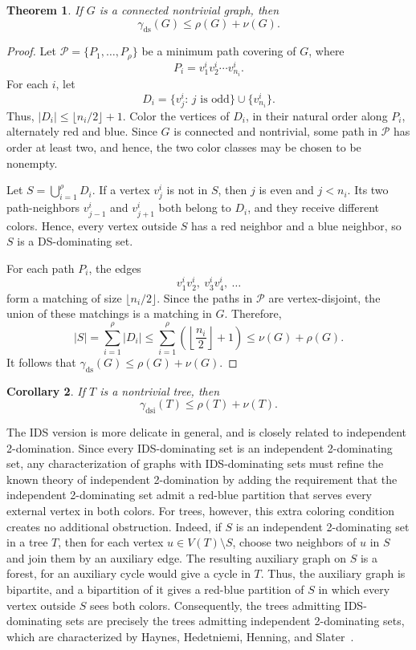 \documentclass[11pt]{article}
\newtheorem{theorem}{Theorem}
\newtheorem{corollary}[theorem]{Corollary}
\theoremstyle{definition}
\theoremstyle{remark}
\newcommand{\ds}{\mathrm{ds}}
\newcommand{\dsi}{\mathrm{dsi}}
\begin{document}
\begin{theorem}
\label{thm:path-cover-matching-ds}
If \(G\) is a connected nontrivial graph, then
\[
   \gamma_{\ds}(G)\le \rho(G)+\nu(G).
\]
\end{theorem}

\begin{proof}
Let \(\mathcal P=\{P_1,\ldots,P_{\rho}\}\) be a minimum path covering of
\(G\), where
\[
   P_i=v^i_1v^i_2\cdots v^i_{n_i}.
\]
For each \(i\), let
\[
   D_i=\{v^i_j:\, j \text{ is odd}\}\cup \{v^i_{n_i}\}.
\]
Thus, \(|D_i|\le \lfloor n_i/2\rfloor+1\). Color the vertices of \(D_i\), in
their natural order along \(P_i\), alternately red and blue. Since \(G\) is
connected and nontrivial, some path in \(\mathcal P\) has order at least two,
and hence, the two color classes may be chosen to be nonempty.

Let \(S=\bigcup_{i=1}^{\rho}D_i\). If a vertex \(v^i_j\) is not in \(S\),
then \(j\) is even and \(j<n_i\). Its two path-neighbors
\(v^i_{j-1}\) and \(v^i_{j+1}\) both belong to \(D_i\), and they receive
different colors. Hence, every vertex outside \(S\) has a red neighbor and a
blue neighbor, so \(S\) is a DS-dominating set.

For each path \(P_i\), the edges
\[
   v^i_1v^i_2,\ v^i_3v^i_4,\ \ldots
\]
form a matching of size \(\lfloor n_i/2\rfloor\). Since the paths in
\(\mathcal P\) are vertex-disjoint, the union of these matchings is a
matching in \(G\). Therefore,
\[
   |S|
      =\sum_{i=1}^{\rho}|D_i|
      \le \sum_{i=1}^{\rho}\left(\left\lfloor\frac{n_i}{2}\right\rfloor+1\right)
      \le \nu(G)+\rho(G).
\]
It follows that \(\gamma_{\ds}(G)\le \rho(G)+\nu(G)\).
\end{proof}

\begin{corollary}
\label{cor:path-cover-matching-trees}
If \(T\) is a nontrivial tree, then
\[
   \gamma_{\dsi}(T)\le \rho(T)+\nu(T).
\]
\end{corollary}





The IDS version is more delicate in general, and is closely related to
independent 2-domination.  Since every IDS-dominating set is an independent 2-dominating
set, any characterization of graphs with IDS-dominating sets must refine the
known theory of independent 2-domination by adding the requirement that the
independent 2-dominating set admit a red-blue partition that serves every
external vertex in both colors. For trees, however, this extra coloring
condition creates no additional obstruction. Indeed, if \(S\) is an
independent 2-dominating set in a tree \(T\), then for each vertex
\(u\in V(T)\setminus S\), choose two neighbors of \(u\) in \(S\) and join
them by an auxiliary edge. The resulting auxiliary graph on \(S\) is a
forest, for an auxiliary cycle would give a cycle in \(T\). Thus, the
auxiliary graph is bipartite, and a bipartition of it gives a red-blue
partition of \(S\) in which every vertex outside \(S\) sees both colors.
Consequently, the trees admitting IDS-dominating sets are precisely the
trees admitting independent 2-dominating sets, which are characterized by
Haynes, Hedetniemi, Henning, and Slater~\cite{HHHS}.
\end{document}
